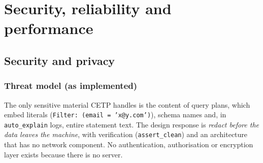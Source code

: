 \chapter{Security, reliability and performance}\label{ch:security}

\section{Security and privacy}
\subsection{Threat model (as implemented)}
The only sensitive material CETP handles is the content of query plans, which embed literals (\texttt{Filter: (email = 'x@y.com')}), schema names and, in \texttt{auto\_explain} logs, entire statement text. The design response is
\emph{redact before the data leaves the machine}, with verification (\texttt{assert\_clean}) and an architecture that has no network component. No authentication, authorisation or encryption layer exists because there is no server.

